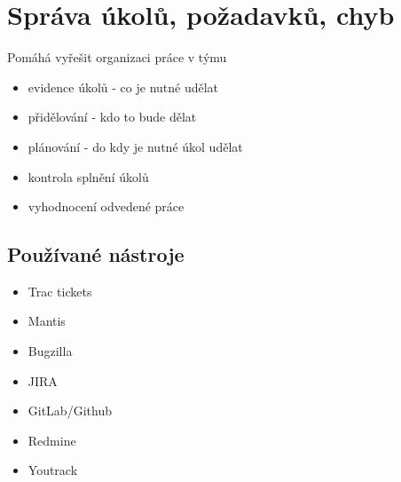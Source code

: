 \documentclass{szzclass}
\author{Jakub Rathouský}
\begin{document}
\tableofcontents
\newpage

\section{Správa úkolů, požadavků, chyb}
Pomáhá vyřešit organizaci práce v týmu
\begin{itemize}
    \item evidence úkolů - co je nutné udělat
    \item přidělování - kdo to bude dělat
    \item plánování - do kdy je nutné úkol udělat
    \item kontrola splnění úkolů
    \item vyhodnocení odvedené práce
\end{itemize}
\subsection{Používané nástroje}
\begin{itemize}
    \item Trac tickets
    \item Mantis
    \item Bugzilla
    \item JIRA
    \item GitLab/Github
    \item Redmine
    \item Youtrack
\end{itemize}
\end{document}
